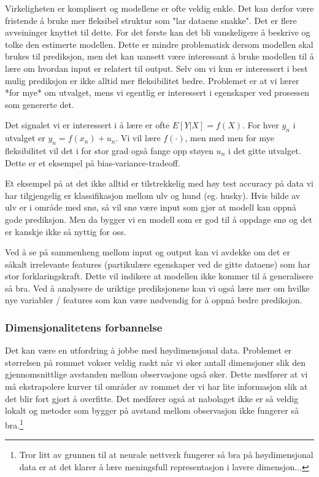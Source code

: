 Virkeligheten er komplisert og modellene er ofte veldig enkle. Det kan derfor være fristende å bruke mer fleksibel struktur som "lar dataene snakke". Det er flere avveininger knyttet til dette. For det første kan det bli vanskeligere å beskrive og tolke den estimerte modellen. Dette er mindre problematisk dersom modellen skal brukes til prediksjon, men det kan uansett være interessant å bruke modellen til å lære om hvordan input er relatert til output. Selv om vi kun er interessert i best mulig prediksjon er ikke alltid mer fleksibilitet bedre. Problemet er at vi lærer *for mye* om utvalget, mens vi egentlig er interessert i egenskaper ved prosessen som genererte det.

Det signalet vi er interessert i å lære er ofte $E[Y|X]=f(X)$. For hver $y_n$ i utvalget er $y_n=f(x_n)+u_n$. Vi vil lære $f(\cdot)$, men med men for mye fleksibilitet vil det i for stor grad også fange opp støyen $u_n$ i det gitte utvalget. Dette er et eksempel på bias-variance-tradeoff.

Et eksempel på at det ikke alltid er tilstrekkelig med høy test accuracy på data vi har tilgjengelig er klassifikasjon mellom ulv og hund (eg. husky). Hvis bilde av ulv er i område med snø, så vil snø være input som gjør at modell kan oppnå gode prediksjon. Men da bygger vi en modell som er god til å oppdage snø og det er kanskje ikke så nyttig for oss.

Ved å se på sammenheng mellom input og output kan vi avdekke om det er såkalt irrelevante features (partikulære egenskaper ved de gitte dataene) som har stor forklaringskraft. Dette vil indikere at modellen ikke kommer til å generalisere så bra. Ved å analysere de uriktige prediksjonene kan vi også lære mer om hvilke nye variabler / features som kan være nødvendig for å oppnå bedre prediksjon.
\subsubsection{Dimensjonalitetens forbannelse}
Det kan være en utfordring å jobbe med høydimensjonal data. Problemet er størrelsen på rommet vokser veldig raskt når vi øker antall dimensjoner slik den gjennomsnittlige avstanden mellom observasjone også øker. Dette medfører at vi må ekstrapolere kurver til områder av rommet der vi har lite informasjon slik at det blir fort gjort å overfitte. Det medfører også at nabolaget ikke er så veldig lokalt og metoder som bygger på avstand mellom observasjon ikke fungerer så bra.\footnote{Tror litt av grunnen til at neurale nettverk fungerer så bra på høydimensjonal data er at det klarer å lære meningsfull representasjon i lavere dimensjon...}
